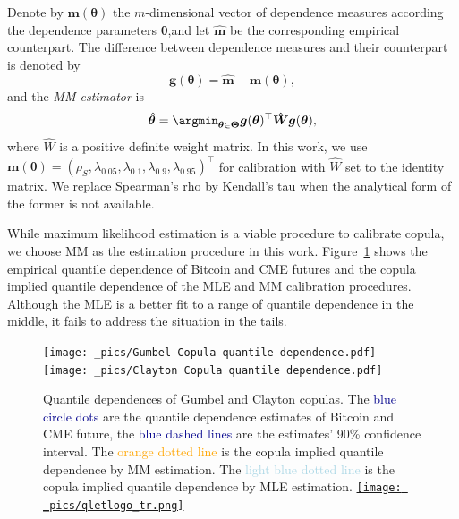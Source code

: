 \documentclass[11pt,a4paper,english]{article}
\begin{document}
Denote by $\bm{m}(\bm{\theta})$ the $m$-dimensional vector of
dependence measures according the dependence parameters
$\bm{\theta}$,and let $\hat{\bm{m}}$ be the corresponding empirical
counterpart. 
The difference between dependence measures and their counterpart is denoted by
\begin{equation*}
    \bm{g}(\bm{\theta}) = \hat{\bm{m}} - \bm{m}(\bm{\theta}),
\end{equation*}
and the {\em MM estimator} is
\begin{equation*}
    \hat{\bm{\theta}} = \argmin_{\bm{\theta}\in \bm{\Theta}} \bm{g}(\bm{\theta})^\top
    \hat{\bm{W}}
     \bm{g}(\bm{\theta}),
\end{equation*}
where $\hat{W}$ is a positive definite weight matrix.
In this work, we use
$\bm{m}(\bm{\theta}) = (\rho_S, \lambda_{0.05}, \lambda_{0.1}, 
\lambda_{0.9}, \lambda_{0.95})^\top$
for calibration with 
$\hat{W}$ set to the identity matrix. 
We replace Spearman's rho by Kendall's tau when the analytical form of the former is not available. 

While maximum likelihood estimation is a viable procedure to calibrate copula, 
we choose MM as the estimation procedure in this work. 
Figure~\ref{fig:quantile dependence1} shows the empirical quantile
dependence of Bitcoin and CME futures and the copula implied quantile
dependence of the MLE and MM calibration procedures. 
Although the MLE is a better fit to a range of quantile dependence in
the middle, it fails to address the situation in the tails. 

\begin{figure}[h]
\texttt{[image: \_pics/Gumbel Copula quantile dependence.pdf]}
\texttt{[image: \_pics/Clayton Copula quantile dependence.pdf]}
  \caption{Quantile dependences of Gumbel and Clayton copulas. The
    \textcolor{darkblue}{blue circle dots} are the quantile dependence
    estimates of Bitcoin and CME future, the \textcolor{darkblue}{blue
      dashed lines} are the estimates' 90\% confidence interval. 
  The \textcolor{orange}{orange dotted line} is the copula implied
  quantile dependence by MM estimation. The
  \textcolor{lightblue}{light blue dotted line} is the copula implied
  quantile dependence by MLE estimation.  
  \href{https://github.com/QuantLet/Hedging-Cryptos-with-Bitcoin-Futures/blob/main/newToQuantlet/Pynotebooks/figures/figure 2.ipynb}{\texttt{[image: \_pics/qletlogo\_tr.png]}}}
  
\label{fig:quantile dependence1}
\end{figure}
\end{document}
